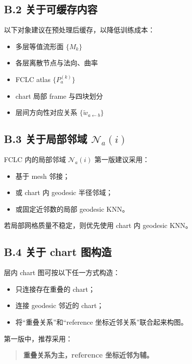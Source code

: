 \documentclass[12pt,a4paper]{ctexart}
\begin{document}
\subsection{B.2 关于可缓存内容}

以下对象建议在预处理后缓存，以降低训练成本：

\begin{itemize}[leftmargin=2em]
    \item 多层等值流形面 \(\{M_k\}\)
    \item 各层离散节点与法向、曲率
    \item FCLC atlas \(\{P_a^{(k)}\}\)
    \item chart 局部 frame 与四块划分
    \item 层间方向性对应关系 \(\{\tilde w_{a\leftarrow b}\}\)
\end{itemize}

\subsection{B.3 关于局部邻域 \(\mathcal N_a(i)\)}

FCLC 内的局部邻域 \(\mathcal N_a(i)\) 第一版建议采用：

\begin{itemize}[leftmargin=2em]
    \item 基于 mesh 邻接；
    \item 或 chart 内 geodesic 半径邻域；
    \item 或固定近邻数的局部 geodesic KNN。
\end{itemize}

若局部网格质量不稳定，则优先使用 chart 内 geodesic KNN。

\subsection{B.4 关于 chart 图构造}

层内 chart 图可按以下任一方式构造：

\begin{itemize}[leftmargin=2em]
    \item 只连接存在重叠的 chart；
    \item 连接 geodesic 邻近的 chart；
    \item 将“重叠关系”和“reference 坐标近邻关系”联合起来构图。
\end{itemize}

第一版中，推荐采用：
\begin{quote}
\textbf{重叠关系为主，reference 坐标近邻为辅。}
\end{quote}
\end{document}
